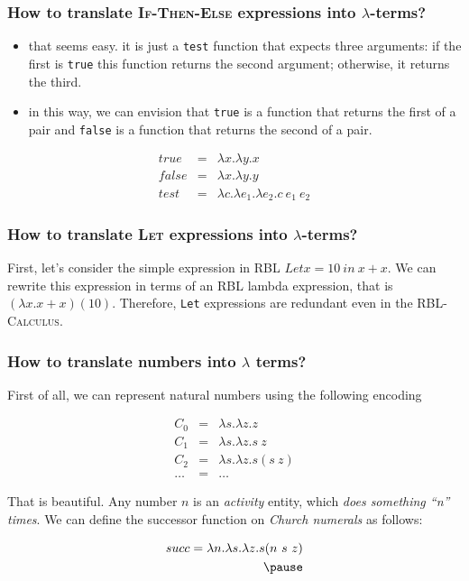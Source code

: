 \documentclass{beamer}
\begin{document}
\begin{frame}
  \frametitle{How to translate \textsc{If-Then-Else} expressions into $\lambda$-terms?} 

  \begin{itemize}
    \item that seems easy. it is just a \texttt{test} function that 
    expects three arguments: if the first is \texttt{true} 
    this function returns the second argument; otherwise, 
    it returns the third.  \pause 

    \item in this way, we can envision that \texttt{true} is a 
    function that returns the first of a pair and \texttt{false} is 
    a function that returns the second of a pair.  \pause 
  \end{itemize} 

  \begin{center}
    \begin{eqnarray*}
      true  & = & \lambda x . \lambda y . x \\
      false & = & \lambda x . \lambda y . y  \\
      test  & = & \lambda c . \lambda e_1 . \lambda e_2 . c\ e_1\ e_2 
    \end{eqnarray*}
  \end{center}

\end{frame}

\begin{frame}
 \frametitle{How to translate \textsc{Let} expressions into $\lambda$-terms?} 

 First, let's consider the simple expression in \textsc{RBL} $Let x = 10\ in\ x + x$. \pause 
 We can rewrite this expression in terms of an \textsc{RBL} lambda expression\pause, that is 
 $(\lambda x . x + x) (10)$. Therefore, \texttt{Let} expressions are redundant even in 
 the \textsc{RBL-Calculus}.
  
\end{frame}

\begin{frame}
 \frametitle{How to translate numbers into $\lambda$ terms?}

  First of all, we can represent natural numbers using the 
  following encoding   
  
  \begin{eqnarray*}
   C_0 & = & \lambda s . \lambda z . z \\ 
   C_1 & = & \lambda s . \lambda z . s\ z \\ 
   C_2 & = & \lambda s . \lambda z . s (s\ z) \\  
   \ldots & = & \ldots
  \end{eqnarray*}

  \pause That is beautiful. Any number $n$ is an \emph{activity} 
  entity, which \emph{does something ``n'' times}. 
  We can define the successor function on \emph{Church numerals} as follows: 
  
  \begin{eqnarray*} 
    succ = \lambda n . \lambda s . \lambda z . s (n\ s\ z) \\ \pause 
   \end{eqnarray*} 
\end{frame}
\end{document}
